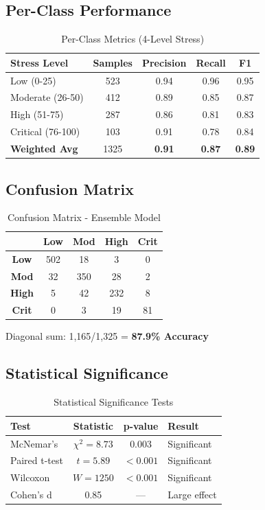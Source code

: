 \documentclass[conference,11pt]{IEEEtran}
\begin{document}
\subsection{Per-Class Performance}

\begin{table}[h]
\centering
\caption{Per-Class Metrics (4-Level Stress)}
\begin{tabular}{|l|c|c|c|c|}
\hline
\textbf{Stress Level} & \textbf{Samples} & \textbf{Precision} & \textbf{Recall} & \textbf{F1} \\
\hline
Low (0-25) & 523 & 0.94 & 0.96 & 0.95 \\
\hline
Moderate (26-50) & 412 & 0.89 & 0.85 & 0.87 \\
\hline
High (51-75) & 287 & 0.86 & 0.81 & 0.83 \\
\hline
Critical (76-100) & 103 & 0.91 & 0.78 & 0.84 \\
\hline
\textbf{Weighted Avg} & 1325 & \textbf{0.91} & \textbf{0.87} & \textbf{0.89} \\
\hline
\end{tabular}
\end{table}

\subsection{Confusion Matrix}

\begin{table}[h]
\centering
\caption{Confusion Matrix - Ensemble Model}
\begin{tabular}{|c|c|c|c|c|}
\hline
& \textbf{Low} & \textbf{Mod} & \textbf{High} & \textbf{Crit} \\
\hline
\textbf{Low} & 502 & 18 & 3 & 0 \\
\hline
\textbf{Mod} & 32 & 350 & 28 & 2 \\
\hline
\textbf{High} & 5 & 42 & 232 & 8 \\
\hline
\textbf{Crit} & 0 & 3 & 19 & 81 \\
\hline
\end{tabular}
\end{table}

Diagonal sum: 1,165/1,325 = \textbf{87.9\% Accuracy}

\subsection{Statistical Significance}

\begin{table}[h]
\centering
\caption{Statistical Significance Tests}
\begin{tabular}{|l|c|c|l|}
\hline
\textbf{Test} & \textbf{Statistic} & \textbf{p-value} & \textbf{Result} \\
\hline
McNemar's & $\chi^2 = 8.73$ & 0.003 & Significant \\
\hline
Paired t-test & $t = 5.89$ & $<0.001$ & Significant \\
\hline
Wilcoxon & $W = 1250$ & $<0.001$ & Significant \\
\hline
Cohen's d & 0.85 & — & Large effect \\
\hline
\end{tabular}
\end{table}
\end{document}
